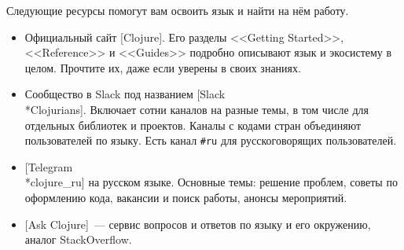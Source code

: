 Следующие ресурсы помогут вам освоить язык и найти на нём работу.

\begin{itemize}

\item
  Официальный сайт [Clojure]. Его
  разделы <<Getting Started>>, <<Reference>> и <<Guides>> подробно описывают
  язык и экосистему в целом. Прочтите их, даже если уверены в своих знаниях.

\item
  Сообщество в Slack под названием
  [Slack\\*Clo\-ju\-ri\-ans].
  Включает сотни каналов на разные темы, в том числе для отдельных библиотек и
  проектов. Каналы с кодами стран объединяют пользователей по языку. Есть канал
  \verb|#ru| для русскоговорящих пользователей.

\item
  [Telegram\\*cloju\-re\_ru]
  на русском языке. Основные темы: решение проблем, советы по
  оформлению кода, вакансии и поиск работы, анонсы мероприятий.

\item
  [Ask Clojure]~---
  сервис вопросов и ответов по языку и его окружению, аналог
  StackOverflow.

\end{itemize}
